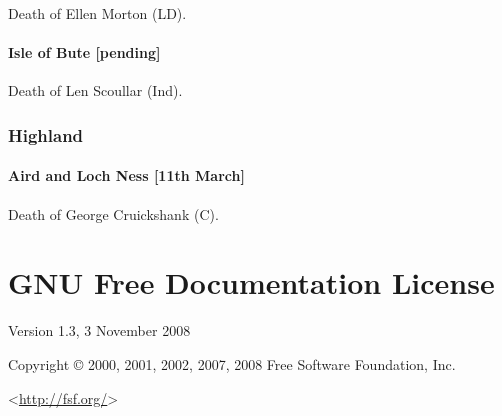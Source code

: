 \documentclass[a4paper,openany]{book}
\begin{document}
\begin{resultsiii}

Death of Ellen Morton (LD).

\subsubsection*{Isle of Bute \hspace*{\fill}\nolinebreak[1]%
	\enspace\hspace*{\fill}
	[pending]}


Death of Len Scoullar (Ind).

\subsection*{Highland}

\subsubsection*{Aird and Loch Ness \hspace*{\fill}\nolinebreak[1]%
	\enspace\hspace*{\fill}
	[11th March]}


Death of George Cruickshank (C).

\end{resultsiii}

\clearpage
{}
{\scriptsize%
\frenchspacing\printindex}
\thispagestyle{plain}

\chapter*{{GNU Free Documentation License}}
\pagestyle{plain}

 Version 1.3, 3 November 2008


 Copyright \copyright{} 2000, 2001, 2002, 2007, 2008 Free Software Foundation, Inc.

 \bigskip

 <\url{http://fsf.org/}>
\end{document}
